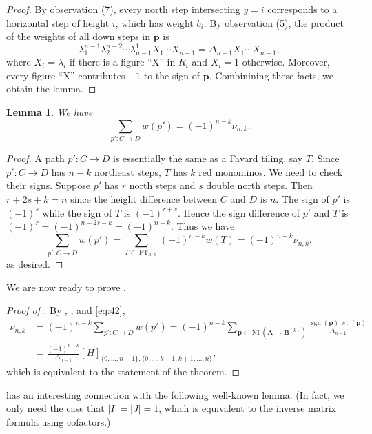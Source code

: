 \documentclass[oneside]{book}
\numberwithin{equation}{section}
\newtheorem{lem}[thm]{Lemma}
\theoremstyle{definition}
\newcommand\NI{\operatorname{NI}}
\newcommand\sgn{\operatorname{sgn}}
\newcommand\FT{\operatorname{FT}}
\newcommand\wt{\operatorname{wt}}
\renewcommand\vec[1]{\bm{#1}}
\begin{document}
\begin{proof}
  By observation (7), every north step intersecting \( y=i \)
  corresponds to a horizontal step of height \( i \), which has weight
  \( b_i \). By observation (5), the product of the weights of all
  down steps in \( \vec p \) is
  \[
    \lambda_1^{n-1} \lambda_2^{n-2} \cdots \lambda_{n-1}^1 X_1 \cdots
    X_{n-1} = \Delta_{n-1} X_1 \cdots X_{n-1},
  \]
  where \( X_i = \lambda_i \) if there is a figure ``X'' in \( R_i \)
  and \( X_i = 1 \) otherwise. Moreover, every figure ``X''
  contributes \( -1 \) to the sign of \( \vec p \).
  Combinining these facts, we obtain the lemma.
\end{proof}

\begin{lem}\label{lem:4}
  We have
  \[
    \sum_{p':C\to D} w(p') = (-1)^{n-k} \nu_{n,k}.
  \]
\end{lem}

\begin{proof}
  A path \( p':C\to D \) is essentially the same as a Favard tiling,
  say \( T \). Since \( p':C\to D \) has \( n-k \) northeast steps,
  \( T \) has \( k \) red monominos. We need to check their signs.
  Suppose \( p' \) has \( r \) north steps and \( s \) double north
  steps. Then \( r+2s+k= n \) since the height difference between
  \( C \) and \( D \) is \( n \). The sign of \( p' \) is
  \( (-1)^{s} \) while the sign of \( T \) is \( (-1)^{r+s} \).
  Hence the sign difference of \( p' \) and \( T \)
  is \( (-1)^{r} = (-1)^{n-2s-k} = (-1)^{n-k} \).
  Thus we have
  \[
    \sum_{p':C\to D} w(p')
    = \sum_{T\in \FT_{n,k}} (-1)^{n-k}w(T) =
    (-1)^{n-k} \nu_{n,k},
  \]
 as desired. 
\end{proof}


We are now ready to prove .

\begin{proof}[Proof of ]
By , , and \eqref{eq:42},
\begin{align*}
 \nu_{n,k} &= (-1)^{n-k} \sum_{p':C\to D} w(p') = 
 (-1)^{n-k} \sum_{\vec p \in \NI(\vec A \to \vec B^{(k)})} 
 \frac{\sgn(\vec p) \wt(\vec p)}{\Delta_{n-1}}\\
           &= \frac{(-1)^{n-k}}{\Delta_{n-1}}
             [H]_{\{0,\dots,n-1\}, \{0,\dots,k-1,k+1,\dots,n\}} ,
\end{align*}
which is equivalent to the statement of the theorem.
\end{proof}

 has an interesting connection with the following
well-known lemma. (In fact, we only need the case that \( |I|=|J|=1 \),
which is equivalent to the inverse matrix formula using cofactors.)
\end{document}
